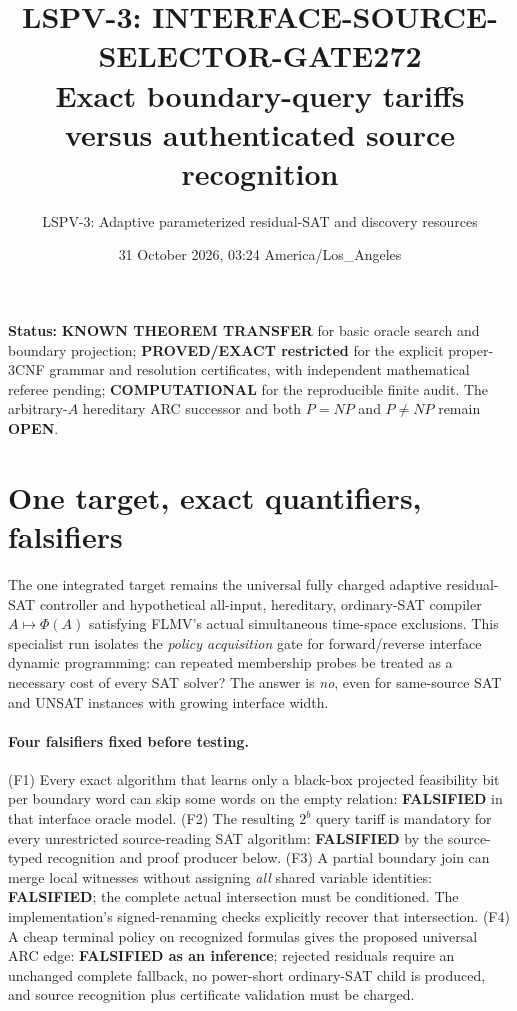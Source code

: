 \documentclass[11pt]{article}
\title{LSPV-3: INTERFACE-SOURCE-SELECTOR-GATE272\\\large Exact boundary-query tariffs versus authenticated source recognition}
\author{LSPV-3: Adaptive parameterized residual-SAT and discovery resources}
\date{31 October 2026, 03:24 America/Los\_Angeles}
\begin{document}
\maketitle
\noindent\textbf{Status:} \textbf{KNOWN THEOREM TRANSFER} for basic oracle search and boundary projection; \textbf{PROVED/EXACT restricted} for the explicit proper-3CNF grammar and resolution certificates, with independent mathematical referee pending; \textbf{COMPUTATIONAL} for the reproducible finite audit. The arbitrary-$A$ hereditary ARC successor and both $P=NP$ and $P\ne NP$ remain \textbf{OPEN}.

\section{One target, exact quantifiers, falsifiers}
The one integrated target remains the universal fully charged adaptive residual-SAT controller and hypothetical all-input, hereditary, ordinary-SAT compiler $A\mapsto\Phi(A)$ satisfying FLMV's actual simultaneous time-space exclusions. This specialist run isolates the \emph{policy acquisition} gate for forward/reverse interface dynamic programming: can repeated membership probes be treated as a necessary cost of every SAT solver? The answer is \emph{no}, even for same-source SAT and UNSAT instances with growing interface width.

\paragraph{Four falsifiers fixed before testing.}
(F1) Every exact algorithm that learns only a black-box projected feasibility bit per boundary word can skip some words on the empty relation: \textbf{FALSIFIED} in that interface oracle model. (F2) The resulting $2^b$ query tariff is mandatory for every unrestricted source-reading SAT algorithm: \textbf{FALSIFIED} by the source-typed recognition and proof producer below. (F3) A partial boundary join can merge local witnesses without assigning \emph{all} shared variable identities: \textbf{FALSIFIED}; the complete actual intersection must be conditioned. The implementation's signed-renaming checks explicitly recover that intersection. (F4) A cheap terminal policy on recognized formulas gives the proposed universal ARC edge: \textbf{FALSIFIED as an inference}; rejected residuals require an unchanged complete fallback, no power-short ordinary-SAT child is produced, and source recognition plus certificate validation must be charged.
\end{document}
